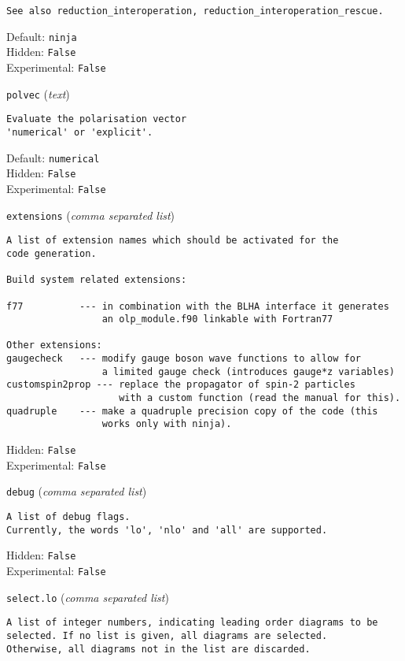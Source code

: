 \begin{basedescript}{\desclabelstyle{\pushlabel}}
\begin{verbatim}
See also reduction_interoperation, reduction_interoperation_rescue.
\end{verbatim}
Default: \verb|ninja|
\\Hidden: \verb|False|
\\Experimental: \verb|False|
\\\item[\colorbox{gray!30}{\texttt{polvec}}] (\textit{text})
\begin{verbatim}
Evaluate the polarisation vector
'numerical' or 'explicit'.
\end{verbatim}
Default: \verb|numerical|
\\Hidden: \verb|False|
\\Experimental: \verb|False|
\\\item[\colorbox{gray!30}{\texttt{extensions}}] (\textit{comma separated list})
\begin{verbatim}
A list of extension names which should be activated for the
code generation.

Build system related extensions:

f77          --- in combination with the BLHA interface it generates
                 an olp_module.f90 linkable with Fortran77

Other extensions:
gaugecheck   --- modify gauge boson wave functions to allow for
                 a limited gauge check (introduces gauge*z variables)
customspin2prop --- replace the propagator of spin-2 particles
                    with a custom function (read the manual for this).
quadruple    --- make a quadruple precision copy of the code (this
                 works only with ninja).
\end{verbatim}
Hidden: \verb|False|
\\Experimental: \verb|False|
\\\item[\colorbox{gray!30}{\texttt{debug}}] (\textit{comma separated list})
\begin{verbatim}
A list of debug flags.
Currently, the words 'lo', 'nlo' and 'all' are supported.
\end{verbatim}
Hidden: \verb|False|
\\Experimental: \verb|False|
\\\item[\colorbox{gray!30}{\texttt{select.lo}}] (\textit{comma separated list})
\begin{verbatim}
A list of integer numbers, indicating leading order diagrams to be
selected. If no list is given, all diagrams are selected.
Otherwise, all diagrams not in the list are discarded.


\end{verbatim}
\end{basedescript}
